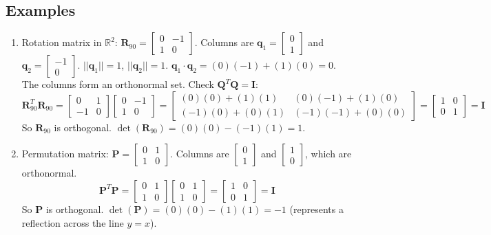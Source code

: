 \documentclass{article}
\newcommand{\vect}[1]{\bm{#1}} %
\newcommand{\mat}[1]{\bm{#1}}  %
\newcommand{\R}{\mathbb{R}}    %
\begin{document}
\subsection*{Examples}
\begin{enumerate}
    \item Rotation matrix in $\R^2$: $\mat{R}_{90} = \begin{bmatrix} 0 & -1 \\ 1 & 0 \end{bmatrix}$.
    Columns are $\vect{q}_1 = \begin{bmatrix} 0 \\ 1 \end{bmatrix}$ and $\vect{q}_2 = \begin{bmatrix} -1 \\ 0 \end{bmatrix}$.
    $||\vect{q}_1|| = 1$, $||\vect{q}_2|| = 1$.
    $\vect{q}_1 \cdot \vect{q}_2 = (0)(-1) + (1)(0) = 0$.
    The columns form an orthonormal set. Check $\mat{Q}^T \mat{Q} = \mat{I}$:
    \[ \mat{R}_{90}^T \mat{R}_{90} = \begin{bmatrix} 0 & 1 \\ -1 & 0 \end{bmatrix} \begin{bmatrix} 0 & -1 \\ 1 & 0 \end{bmatrix} = \begin{bmatrix} (0)(0)+(1)(1) & (0)(-1)+(1)(0) \\ (-1)(0)+(0)(1) & (-1)(-1)+(0)(0) \end{bmatrix} = \begin{bmatrix} 1 & 0 \\ 0 & 1 \end{bmatrix} = \mat{I} \]
    So $\mat{R}_{90}$ is orthogonal. $\det(\mat{R}_{90}) = (0)(0) - (-1)(1) = 1$.

    \item Permutation matrix: $\mat{P} = \begin{bmatrix} 0 & 1 \\ 1 & 0 \end{bmatrix}$. Columns are $\begin{bmatrix} 0 \\ 1 \end{bmatrix}$ and $\begin{bmatrix} 1 \\ 0 \end{bmatrix}$, which are orthonormal.
    \[ \mat{P}^T \mat{P} = \begin{bmatrix} 0 & 1 \\ 1 & 0 \end{bmatrix} \begin{bmatrix} 0 & 1 \\ 1 & 0 \end{bmatrix} = \begin{bmatrix} 1 & 0 \\ 0 & 1 \end{bmatrix} = \mat{I} \]
    So $\mat{P}$ is orthogonal. $\det(\mat{P}) = (0)(0) - (1)(1) = -1$ (represents a reflection across the line $y=x$).
\end{enumerate}
\end{document}
